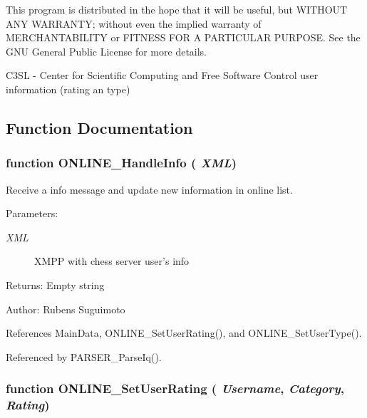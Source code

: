 This program is distributed in the hope that it will be useful, but WITHOUT ANY WARRANTY; without even the implied warranty of MERCHANTABILITY or FITNESS FOR A PARTICULAR PURPOSE. See the GNU General Public License for more details.

C3SL - Center for Scientific Computing and Free Software Control user information (rating an type) 

\subsection{Function Documentation}
\subsubsection[ONLINE\_\-HandleInfo]{\setlength{\rightskip}{0pt plus 5cm}function ONLINE\_\-HandleInfo ( {\em XML})}\label{online__info_8js_b6356c6c76ef774d604c6074e5656fee}


Receive a info message and update new information in online list. 

\begin{Desc}
\item[Parameters:]
\begin{description}
\item[{\em XML}]XMPP with chess server user's info \end{description}
\end{Desc}
\begin{Desc}
\item[Returns:]Empty string \end{Desc}
\begin{Desc}
\item[Author:]Rubens Suguimoto \end{Desc}


References MainData, ONLINE\_\-SetUserRating(), and ONLINE\_\-SetUserType().

Referenced by PARSER\_\-ParseIq().
\subsubsection[ONLINE\_\-SetUserRating]{\setlength{\rightskip}{0pt plus 5cm}function ONLINE\_\-SetUserRating ( {\em Username}, \/   {\em Category}, \/   {\em Rating})}\label{online__info_8js_b0f63008392258fa2461740bb8162372}


